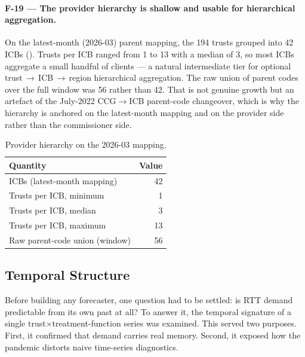 \documentclass[11pt,a4paper]{article}
\begin{document}
\paragraph{F-19 --- The provider hierarchy is shallow and usable for hierarchical
aggregation.} On the latest-month (2026-03) parent mapping, the 194 trusts grouped
into 42 ICBs (). Trusts per ICB ranged from 1 to 13 with a median of
3, so most ICBs aggregate a small handful of clients --- a natural intermediate tier
for optional trust\,$\rightarrow$\,ICB\,$\rightarrow$\,region hierarchical
aggregation. The raw union of parent codes over the full window was 56 rather than
42. That is not genuine growth but an artefact of the July-2022 CCG$\rightarrow$ICB
parent-code changeover, which is why the hierarchy is anchored on the latest-month
mapping and on the provider side rather than the commissioner side.

\begin{table}[H]
\centering
\caption{Provider hierarchy on the 2026-03 mapping.}
\label{tab:icb}
\begin{tabular}{lr}
\toprule
Quantity & Value \\
\midrule
ICBs (latest-month mapping)   & 42 \\
Trusts per ICB, minimum       & 1 \\
Trusts per ICB, median        & 3 \\
Trusts per ICB, maximum       & 13 \\
Raw parent-code union (window) & 56 \\
\bottomrule
\end{tabular}
\end{table}

\subsection{Temporal Structure}\label{sec:temporal}

Before building any forecaster, one question had to be settled: is RTT demand predictable from its own past at all? To answer it, the temporal signature of a single trust$\times$treatment-function series was examined. This served two purposes. First, it confirmed that demand carries real memory. Second, it exposed how the pandemic distorts naive time-series diagnostics.
\end{document}
